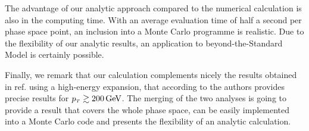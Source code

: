 The advantage of our analytic approach compared to the numerical
calculation is also in the computing time. With an average evaluation
time of half a second per phase space point, an inclusion into a Monte Carlo
programme is realistic. Due to the flexibility of our analytic
results, an application to beyond-the-Standard Model is certainly
possible.

Finally, we remark that our calculation complements
nicely the results obtained in ref.\cite{Davies:2020drs} using a high-energy
expansion, that according to the authors provides precise results for
$p_{\scriptscriptstyle T} \gtrsim 200\,\textrm{GeV}$. The merging of the two analyses is going to provide
a result that covers the whole phase space, can be easily implemented into a
Monte Carlo code and  presents the flexibility of an analytic calculation.